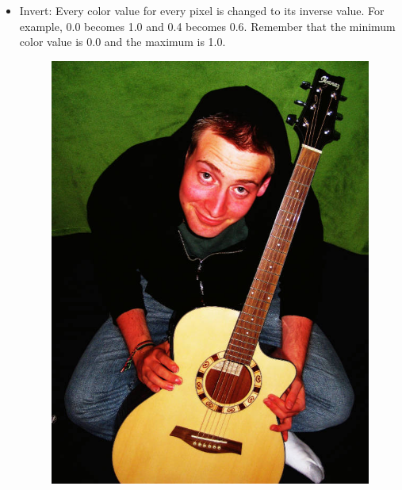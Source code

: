 \begin{itemize}
\item Invert:
Every color value for every pixel is changed to its inverse value.
For example, 0.0 becomes 1.0 and 0.4 becomes 0.6.
Remember that the minimum color value is 0.0 and the maximum is 1.0.

\begin{figure}[ht]
\begin{minipage}[b]{0.47\linewidth}
\centering
\includegraphics[width=\textwidth]{Original.jpg}
\end{minipage}
\hspace{0.1cm}
\begin{minipage}[b]{0.47\linewidth}
\centering

\end{minipage}
\end{figure}
\end{itemize}
